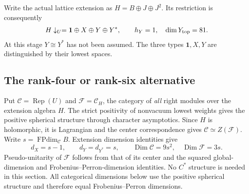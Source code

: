\documentclass[11pt,a4paper]{article}
\theoremstyle{definition}
\begin{document}
Write the actual lattice extension as $H=B\oplus J\oplus J^2$. Its
restriction is consequently
\begin{equation}
 H\downarrow_U=\mathbf1\oplus X\oplus Y\oplus Y^*,\qquad
 h_Y=1,\quad\dim Y_{\rm top}=81.
 \label{eq:H-branching-fork}
\end{equation}
At this stage $Y\cong Y^*$ has not been assumed. The three types
$\mathbf1,X,Y$ are distinguished by their lowest spaces.

\subsection{The rank-four or rank-six alternative}

Put $\mathcal C=\operatorname{Rep}(U)$ and
$\mathcal F=\mathcal C_H$, the category of \emph{all} right modules
over the extension algebra $H$. The strict positivity of nonvacuum
lowest weights gives the positive spherical structure through character
asymptotics. Since $H$ is holomorphic, it is Lagrangian and the
center correspondence \cite[Section~4]{DMNO}
gives $\mathcal C\simeq Z(\mathcal F)$.
Write $s=\operatorname{FPdim}_{\mathcal C}B$. Extension dimension
identities give
\[
 d_X=s-1,\qquad d_Y=d_{Y^*}=s,\qquad
 \operatorname{Dim}\mathcal C=9s^2,\quad
 \operatorname{Dim}\mathcal F=3s.
\]
Pseudo-unitarity of $\mathcal F$ follows from that of its center and
the squared global-dimension and Frobenius--Perron-dimension identities.
No $C^*$ structure is needed in this section. All categorical dimensions
below use the positive spherical structure and therefore equal
Frobenius--Perron dimensions.
\end{document}
